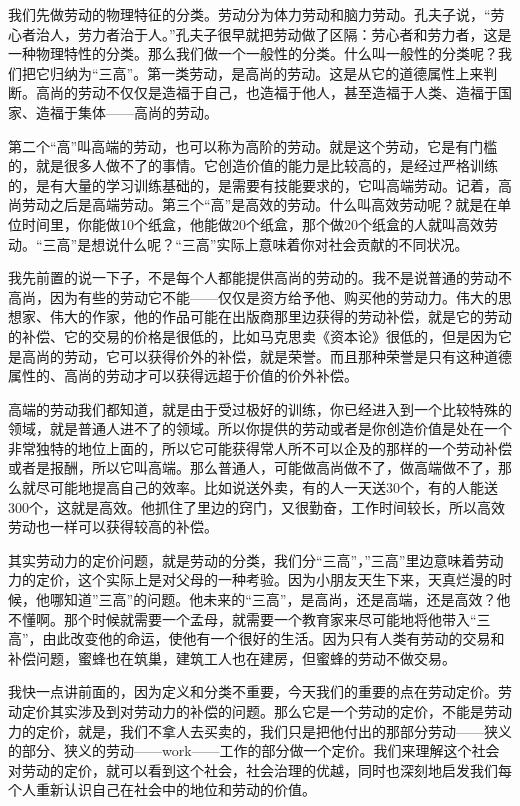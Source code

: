 \documentclass[UTF8, 12pt, a4paper]{ctexrep}
\begin{document}
我们先做劳动的物理特征的分类。劳动分为体力劳动和脑力劳动。孔夫子说，“劳心者治人，劳力者治于人。”孔夫子很早就把劳动做了区隔：劳心者和劳力者，这是一种物理特性的分类。那么我们做一个一般性的分类。什么叫一般性的分类呢？我们把它归纳为“三高”。第一类劳动，是高尚的劳动。这是从它的道德属性上来判断。高尚的劳动不仅仅是造福于自己，也造福于他人，甚至造福于人类、造福于国家、造福于集体——高尚的劳动。

第二个“高”叫高端的劳动，也可以称为高阶的劳动。就是这个劳动，它是有门槛的，就是很多人做不了的事情。它创造价值的能力是比较高的，是经过严格训练的，是有大量的学习训练基础的，是需要有技能要求的，它叫高端劳动。记着，高尚劳动之后是高端劳动。第三个“高”是高效的劳动。什么叫高效劳动呢？就是在单位时间里，你能做10个纸盒，他能做20个纸盒，那个做20个纸盒的人就叫高效劳动。“三高”是想说什么呢？“三高”实际上意味着你对社会贡献的不同状况。

我先前置的说一下子，不是每个人都能提供高尚的劳动的。我不是说普通的劳动不高尚，因为有些的劳动它不能——仅仅是资方给予他、购买他的劳动力。伟大的思想家、伟大的作家，他的作品可能在出版商那里边获得的劳动补偿，就是它的劳动的补偿、它的交易的价格是很低的，比如马克思卖《资本论》很低的，但是因为它是高尚的劳动，它可以获得价外的补偿，就是荣誉。而且那种荣誉是只有这种道德属性的、高尚的劳动才可以获得远超于价值的价外补偿。

高端的劳动我们都知道，就是由于受过极好的训练，你已经进入到一个比较特殊的领域，就是普通人进不了的领域。所以你提供的劳动或者是你创造价值是处在一个非常独特的地位上面的，所以它可能获得常人所不可以企及的那样的一个劳动补偿或者是报酬，所以它叫高端。那么普通人，可能做高尚做不了，做高端做不了，那么就尽可能地提高自己的效率。比如说送外卖，有的人一天送30个，有的人能送300个，这就是高效。他抓住了里边的窍门，又很勤奋，工作时间较长，所以高效劳动也一样可以获得较高的补偿。

其实劳动力的定价问题，就是劳动的分类，我们分“三高”，”三高”里边意味着劳动力的定价，这个实际上是对父母的一种考验。因为小朋友天生下来，天真烂漫的时候，他哪知道”三高”的问题。他未来的“三高”，是高尚，还是高端，还是高效？他不懂啊。那个时候就需要一个孟母，就需要一个教育家来尽可能地将他带入“三高”，由此改变他的命运，使他有一个很好的生活。因为只有人类有劳动的交易和补偿问题，蜜蜂也在筑巢，建筑工人也在建房，但蜜蜂的劳动不做交易。

我快一点讲前面的，因为定义和分类不重要，今天我们的重要的点在劳动定价。劳动定价其实涉及到对劳动力的补偿的问题。那么它是一个劳动的定价，不能是劳动力的定价，就是，我们不拿人去买卖的，我们只是把他付出的那部分劳动——狭义的部分、狭义的劳动——work——工作的部分做一个定价。我们来理解这个社会对劳动的定价，就可以看到这个社会，社会治理的优越，同时也深刻地启发我们每个人重新认识自己在社会中的地位和劳动的价值。
\end{document}
